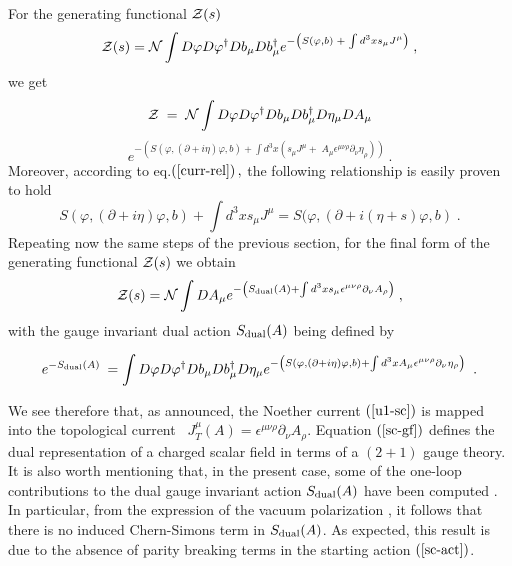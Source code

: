\documentclass[a4paper,12pt]{article}
\begin{document}
For the generating functional ${\cal Z}(s)$
\begin{equation}
{\cal Z}(s)={\cal N}\int D\varphi D\varphi ^{\dagger }Db_\mu Db_\mu^{\dagger }e^{-\left( S(\varphi ,b)\;+\;\int d^3xs_\mu J^\mu \right)
\;},
\label{sc-g-f}
\end{equation}
we get
$$
{\cal Z} \;=\;{\cal N}\int D\varphi D\varphi ^{\dagger }Db_\mu
Db_\mu ^{\dagger }D\eta _\mu DA_\mu
$$
\begin{equation}
e^{-\left( S(\varphi ,(\partial +i\eta )\varphi ,b)+\int d^3x(s_\mu
J^\mu +\;A_\mu \epsilon ^{\mu \nu \rho }\partial _\nu \eta _\rho
)\right) \;}.
\label{sc-g-f1}
\end{equation}
Moreover, according to eq.$\left( {\rm {\ref{curr-rel}}}\right) ,$ the
following relationship is easily proven to hold
\begin{equation}
S(\varphi ,(\partial +i\eta )\varphi ,b)+\int d^3xs_\mu J^\mu
=S(\varphi ,(\partial +i(\eta +s)\varphi ,b)\;.
\label{sc-curr-rel}
\end{equation}
Repeating now the same steps of the previous section, for the final
form of the generating functional ${\cal Z}(s)\;$we obtain
\begin{equation}
{\cal Z}(s)={\cal N}\int DA_\mu e^{-\left( S_{{\rm dual}}(A)+\int d^3xs_\mu
\epsilon ^{\mu \nu \rho }\partial _\nu A_\rho \right) \;},  \label{sc-gf}
\end{equation}
with the gauge invariant dual action $S_{{\rm dual}}(A)$ being defined
by

\begin{equation}
e^{-S_{{\rm dual}}(A)\;}=\int D\varphi D\varphi ^{\dagger }Db_\mu Db_\mu^{\dagger }D\eta _\mu e^{-\left( S(\varphi ,(\partial +i\eta )\varphi
,b)+\int d^3xA_\mu \epsilon ^{\mu \nu \rho }\partial _\nu \eta _\rho
\right) \;}\;.  \label{sc-d-act}
\end{equation}

We see therefore that, as announced, the Noether current $\left( {\rm
    {\ref {u1-sc}}}\right) $ is mapped into the topological current \
$J_T^\mu (A)=\epsilon ^{\mu \nu \rho }\partial _\nu A_\rho $.
Equation $\left( {\rm {\ref{sc-gf}}}\right) $ defines the dual
representation of a charged scalar field in terms of a $(2+1)$ gauge
theory. It is also worth mentioning that, in the present case, some of
the one-loop contributions to the dual gauge invariant action $S_{{\rm
    dual}}(A)$ have been computed \cite {chaichian}. In particular,
from the expression of the vacuum polarization
\cite{chaichian}, it follows that there is no induced Chern-Simons term in $%
S_{{\rm dual}}(A)$. As expected, this result is due to the absence of
parity breaking terms in the starting action $\left( {\rm
    {\ref{sc-act}}}\right)$.
\end{document}
